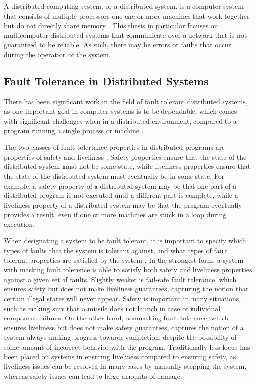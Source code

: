 \documentclass[twoside]{report}
\begin{document}
A distributed computing system, or a distributed system, is a computer system that consists of multiple processors one one or more machines that work together but do not directly share memory \cite{10.1145/72551.72552}.
This thesis in particular focuses on multicomputer distributed systems that communicate over a network that is not guaranteed to be reliable.
As such, there may be errors or faults that occur during the operation of the system.

\subsection{Fault Tolerance in Distributed Systems}
There has been significant work in the field of fault tolerant distributed systems, as one important goal in computer systems is to be dependable, which comes with significant challenges when in a distributed environment, compared to a program running a single process or machine \cite{10.1145/311531.311532}.

The two classes of fault tolertance properties in distributed programs are properties of safety and liveliness \cite{1702415}.
Safety properties ensure that the state of the distributed system must not be some state, while liveliness properties ensure that the state of the distributed system must eventually be in some state.
For example, a safety property of a distributed system may be that one part of a distributed program is not executed until a different part is complete, while a liveliness property of a distributed system may be that the program eventually provides a result, even if one or more machines are stuck in a loop during execution.

When designating a system to be fault tolerant, it is important to specify which types of faults that the system is tolerant against, and what types of fault tolerant properties are satisfied by the system \cite{10.1145/311531.311532}.
In the strongest form, a system with masking fault tolerence is able to satisfy both safety and liveliness properties against a given set of faults.
Slightly weaker is fail-safe fault tolerance, which ensures safety but does not make liveliness guarantees, capturing the notion that certain illegal states will never appear.
Safety is important in many situations, such as making sure that a missile does not launch in case of individual component failures.
On the other hand, nonmasking fault tolerence, which ensures liveliness but does not make safety guarantees, captures the notion of a system always making progress towards completion, despite the possibility of some amount of incorrect behavior with the program.
Traditionally less focus has been placed on systems in ensuring liveliness compared to ensuring safety, as liveliness issues can be resolved in many cases by manually stopping the system, whereas safety issues can lead to large amounts of damage.
\end{document}
